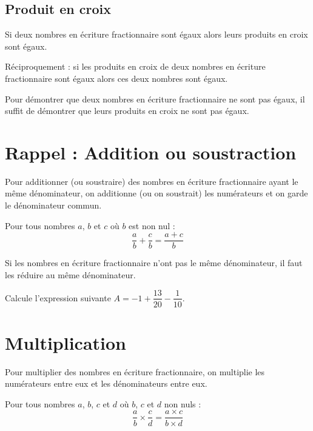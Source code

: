 \documentclass[a4paper,10pt]{report}
\begin{document}
\subsection{Produit en croix}

\begin{prop}
Si deux nombres en écriture fractionnaire sont égaux alors leurs produits en croix sont égaux.

\medskip
\noindent Réciproquement : si les produits en croix de deux nombres en écriture fractionnaire sont égaux alors ces deux nombres sont égaux.
\end{prop}

\begin{rem}
Pour démontrer que deux nombres en écriture fractionnaire ne sont pas égaux, il suffit de démontrer que leurs produits en croix ne sont pas égaux.
\end{rem}

\section{Rappel : Addition ou soustraction}

\begin{memento}
Pour additionner (ou soustraire) des nombres en écriture fractionnaire ayant le même dénominateur, on additionne (ou on soustrait) les numérateurs et on garde le dénominateur commun.

\medskip
\noindent Pour tous nombres $a$, $b$ et $c$ où $b$ est non nul :
$$\dfrac{a}{b}+\dfrac{c}{b} = \dfrac{a+c}{b}$$
\end{memento}

\begin{rem}
Si les nombres en écriture fractionnaire n'ont pas le même dénominateur, il faut les réduire au même dénominateur.
\end{rem}

\begin{ex}
Calcule l'expression suivante $A=-1+\dfrac{13}{20}-\dfrac{1}{10}$.

\noindent\grandscarreaux{\linewidth}{5.6cm}
\end{ex}

\section{Multiplication}

\begin{memento}
Pour multiplier des nombres en écriture fractionnaire, on multiplie les numérateurs entre eux et les dénominateurs entre eux.

\medskip
\noindent Pour tous nombres $a$, $b$, $c$ et $d$ où $b$, $c$ et $d$ non nuls :
$$\dfrac{a}{b} \times \dfrac{c}{d} = \dfrac{a \times c}{b \times d}$$
\end{memento}
\end{document}
